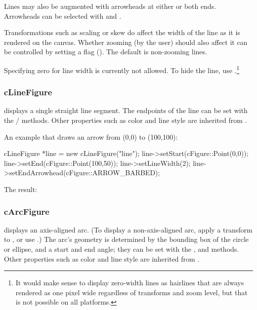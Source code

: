 Lines may also be augmented with arrowheads at either or both ends.
Arrowheads can be selected with  and
.

Transformations such as scaling or skew do affect the width of the line as it
is rendered on the canvas. Whether zooming (by the user) should also affect
it can be controlled by setting a flag ().
The default is non-zooming lines.

Specifying zero for line width is currently not allowed. To hide the line,
use .\footnote{It would make sense to display
zero-width lines as hairlines that are always rendered as one pixel wide
regardless of transforms and zoom level, but that is not possible on all
platforms.}


\subsubsection{cLineFigure}
\label{sec:graphics:linefigure}

 displays a single straight line segment. The endpoints
of the line can be set with the /
methods. Other properties such as color and line style are inherited from
.

An example that draws an arrow from (0,0) to (100,100):

\begin{cpp}
cLineFigure *line = new cLineFigure("line");
line->setStart(cFigure::Point(0,0));
line->setEnd(cFigure::Point(100,50));
line->setLineWidth(2);
line->setEndArrowhead(cFigure::ARROW_BARBED);
\end{cpp}

The result:

\begin{center}

\end{center}


\subsubsection{cArcFigure}
\label{sec:graphics:arcfigure}

 displays an axis-aligned arc. (To display a
non-axis-aligned arc, apply a transform to , or use
.) The arc's geometry is determined by the bounding box
of the circle or ellipse, and a start and end angle; they can be set with
the ,  and 
methods. Other properties such as color and line style are inherited from
.


